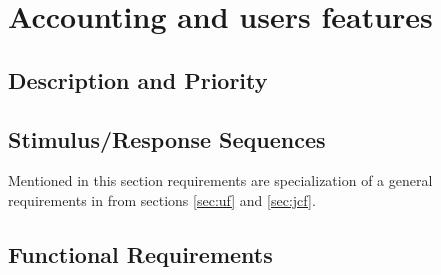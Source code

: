 \documentclass{report}
\begin{document}
\section{Accounting and users features}

\subsection{Description and Priority}

\subsection{Stimulus/Response Sequences}
Mentioned in this section requirements are specialization of a general requirements in from sections \ref{sec:uf} and \ref{sec:jcf}. 
\subsection{Functional Requirements}
\end{document}
